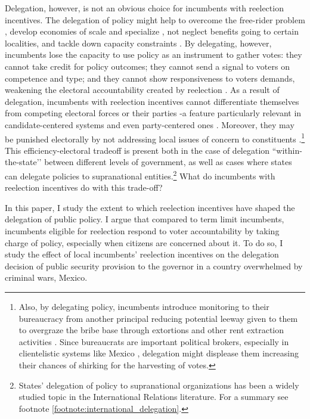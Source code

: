 \documentclass[12pt]{amsart}
\numberwithin{equation}{section}
\theoremstyle{definition}
\theoremstyle{definition}
\theoremstyle{definition}
\begin{document}
Delegation, however, is not an obvious choice for incumbents with reelection incentives. The delegation of policy might help to overcome the free-rider problem \citep{hamman_etal_2011}, develop economies of scale and specialize \citep{Hawkins_etal_2006}, not neglect benefits going to certain localities, and tackle down capacity constraints \citep{oates_1972, besley_coate_2003}. By delegating, however, incumbents lose the capacity to use policy as an instrument to gather votes: they cannot take credit for policy outcomes; they cannot send a signal to voters on competence and type; and they cannot show responsiveness to voters demands, weakening the electoral accountability created by reelection \citep{cox_katz_2002}. As a result of delegation, incumbents with reelection incentives cannot differentiate themselves from competing electoral forces or their parties -a feature particularly relevant in candidate-centered systems and even party-centered ones \citep{motolinia_2020}. Moreover, they may be punished electorally by not addressing local issues of concern to constituents \citep{milner_2004}.\footnote{Also, by delegating policy, incumbents introduce monitoring to their bureaucracy from another principal reducing potential leeway given to them to overgraze the bribe base through extortions and other rent extraction activities \citep{schleifer_vishny_1993}. Since bureaucrats are important political brokers, especially in clientelistic systems like Mexico \citep{larreguy_etal_2017}, delegation might displease them increasing their chances of shirking for the harvesting of votes.} This efficiency-electoral tradeoff is present both in the case of delegation ``within-the-state’’ between different levels of government, as well as cases where states can delegate policies to supranational entities.\footnote{States’ delegation of policy to supranational organizations has been a widely studied topic in the International Relations literature. For a summary see footnote \ref{footnote:international_delegation}.} What do incumbents with reelection incentives do with this trade-off?    
   
In this paper, I study the extent to which reelection incentives have shaped the delegation of public policy. I argue that compared to term limit incumbents, incumbents eligible for reelection respond to voter accountability by taking charge of policy, especially when citizens are concerned about it. To do so, I study the effect of local incumbents' reelection incentives on the delegation decision of public security provision to the governor in a country overwhelmed by criminal wars, Mexico. 
\end{document}

